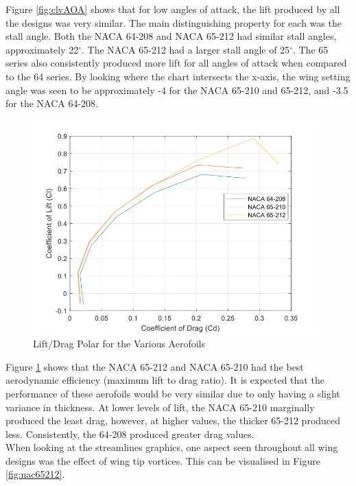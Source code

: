 \documentclass[12pt]{article}
\begin{document}
\noindent Figure \ref{fig:clvAOA} shows that for low angles of attack, the lift produced by all the designs was very similar. The main distinguishing property for each was the stall angle. Both the NACA 64-208 and NACA 65-212 had similar stall angles, approximately 22$^{\circ}$. The NACA 65-212 had a larger stall angle of 25$^{\circ}$. The 65 series also consistently produced more lift for all angles of attack when compared to the 64 series. By looking where the chart intersects the x-axis, the wing setting angle was seen to be approximately -4 for the NACA 65-210 and 65-212, and -3.5 for the NACA 64-208. \\

\begin{figure}[H]
\includegraphics[width=11cm, scale=1]{clvcd.png}
\centering
\caption{Lift/Drag Polar for the Various Aerofoils}
\label{fig:clvcd}
\end{figure}

\noindent Figure \ref{fig:clvcd} shows that the NACA 65-212 and NACA 65-210 had the best aerodynamic efficiency (maximum lift to drag ratio). It is expected that the performance of these aerofoils would be very similar due to only having a slight variance in thickness. At lower levels of lift, the NACA 65-210 marginally produced the least drag, however, at higher values, the thicker 65-212 produced less. Consistently, the 64-208 produced greater drag values. \\

\noindent When looking at the streamlines graphics, one aspect seen throughout all wing designs was the effect of wing tip vortices. This can be visualised in Figure \ref{fig:nac65212}. \\
\end{document}
